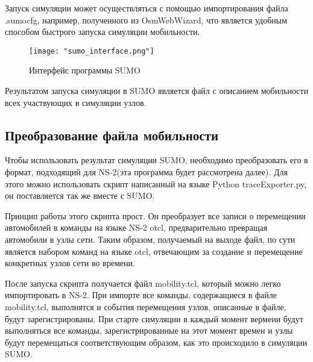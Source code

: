 Запуск симуляции может осуществляться с помощью импортирования файла .sumocfg, например, полученного из OsmWebWizard, что является удобным способом быстрого запуска симуляции мобильности.

\begin{figure}
    \centering
    \texttt{[image: "sumo\_interface.png"]}
    \caption{Интерфейс программы SUMO}
    \label{fig:sumo_interface}
\end{figure}

Результатом запуска симуляции в SUMO является файл с описанием мобильности всех участвующих в симуляции узлов.

\subsection*{Преобразование файла мобильности}

Чтобы использовать результат симуляции SUMO, необходимо преобразовать его в формат, подходящий для NS-2(эта программа будет рассмотрена далее). Для этого можно использовать скрипт написанный на языке Python traceExporter.py, он поставляется так же вместе с SUMO.

Принцип работы этого скрипта прост. Он преобразует все записи о перемещении автомобилей в команды на языке NS-2 otcl, предварительно превращая автомобили в узлы сети. Таким образом, получаемый на выходе файл, по сути является набором команд на языке otcl, отвечающим за создание и перемещение конкретных узлов сети во времени.

После запуска скрипта получается файл mobility.tcl, который можно легко импортировать в NS-2. При импорте все команды, содержащиеся в файле mobility.tcl, выполнятся и события перемещения узлов, описанные в файле, будут зарегистрированы. При старте симуляции в каждый момент вермени будут выполняться все команды, зарегистрированные на этот момент времен и узлы будут перемещаться соответствующим образом, как это происходило в симуляции SUMO.
